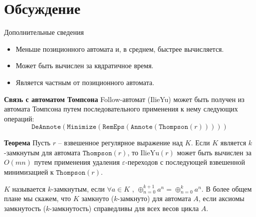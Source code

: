 \documentclass[mathserif]{beamer}
\def\IlieYu{\mathrm{IlieYu}}
\def\Thompson{\mathtt{Thompson}}
\def\RemEps{\mathtt{RemEps}}
\def\DeAnnote{\mathtt{DeAnnote}}
\def\Annote{\mathtt{Annote}}
\def\Minimize{\mathtt{Minimize}}
\newcommand{\empt}{\varepsilon} %
\begin{document}
\section{Обсуждение}
\begin{frame}{Дополнительные сведения}  {\vspace{-5pt}}
   {
    \begin{block}{\bf }
      \begin{itemize}
        \item Меньше позиционного автомата и, в среднем, быстрее вычисляется.
        \item Может быть вычислен за квдратичное время.
        \item Является частным от позиционного автомата.
      \end{itemize}
    \end{block}
    \begin{block}{\bf Связь с автоматом Томпсона}
      Follow-автомат (IlieYu) может быть получен из автомата Томпсона путем последовательного применения к нему следующих операций:
      \[\DeAnnote(\Minimize(\RemEps(\Annote(\Thompson(r)))))\] %
    \end{block}
  }
   {
    \begin{block}{\bf Теорема}
      Пусть $r$ -- взвешенное регулярное выражение над $K$. Если $K$ является $k$-замкнутым для автомата $\Thompson(r)$, то $\IlieYu(r)$ может быть вычислен за $O(mn)$ путем применения удаления $\empt$-переходов с последующей взвешенной минимизацией к  $\Thompson(r)$.
    \end{block}
    $K$ называется $k$-замкнутым, если $\forall a \in K$ , $\oplus_{n=0}^{k+1} a^n = \oplus_{n=0}^{k} a^n$. В более общем плане мы скажем, что $K$ замкнуто ($k$-замкнуто) для автомата $A$, если  аксиомы замкнутость ($k$-замкнутость) справедливы для всех весов цикла $A$.
  }
\end{frame}
\end{document}
